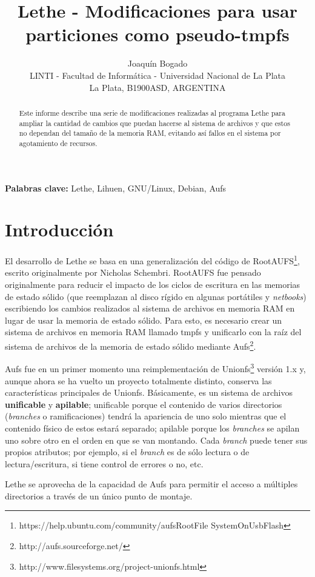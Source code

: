 \documentclass[a4paper,10pt]{article}
\author{Joaquín Bogado
\\LINTI - Facultad de Informática - Universidad Nacional de La Plata
\\La Plata, B1900ASD, ARGENTINA}
\title{Lethe - Modificaciones para usar particiones como pseudo-tmpfs}
\begin{document}
\maketitle
\sloppy

\begin{abstract}
\noindent Este informe describe una serie de modificaciones realizadas al programa Lethe para ampliar la cantidad de cambios
que
puedan hacerse al sistema de archivos y que estos no dependan del tamaño de la memoria RAM, evitando así fallos en
el sistema por agotamiento de recursos.
\end{abstract}

\noindent \textbf{Palabras clave: } Lethe, Lihuen, GNU/Linux, Debian, Aufs

\section{Introducción}
El desarrollo de Lethe se basa en una generalización del código de
RootAUFS\footnote{https://help.ubuntu.com/community/aufsRootFile SystemOnUsbFlash}, escrito originalmente por Nicholas
Schembri. RootAUFS fue pensado originalmente para reducir el impacto de los ciclos de escritura en las memorias de estado
sólido (que reemplazan al disco rígido en algunas portátiles y \textit{netbooks}) escribiendo los cambios realizados al
sistema de archivos en memoria RAM en lugar de usar la memoria de estado sólido. Para esto, es necesario crear un sistema de
archivos en memoria RAM llamado tmpfs y unificarlo con la raíz del sistema de archivos de la memoria de estado sólido
mediante Aufs\footnote{http://aufs.sourceforge.net/}.

Aufs fue en un primer momento una reimplementación de Unionfs\footnote{http://www.filesystems.org/project-unionfs.html}
versión 1.x y, aunque ahora se ha vuelto un proyecto totalmente distinto, conserva las características principales de
Unionfs. Básicamente, es un sistema de archivos \textbf{unificable} y \textbf{apilable}; unificable porque el contenido de
varios directorios (\textit{branches} o ramificaciones) tendrá la apariencia de uno solo mientras que el contenido físico de
estos estará separado; apilable porque los \textit{branches} se apilan uno sobre otro en el orden en que se van montando.
Cada \textit{branch} puede tener sus propios atributos; por ejemplo, si el \textit{branch} es de sólo lectura o de
lectura/escritura, si tiene control de errores o no, etc.

Lethe se aprovecha de la capacidad de Aufs para permitir el acceso a múltiples directorios a través de un único punto de
montaje.
\end{document}
